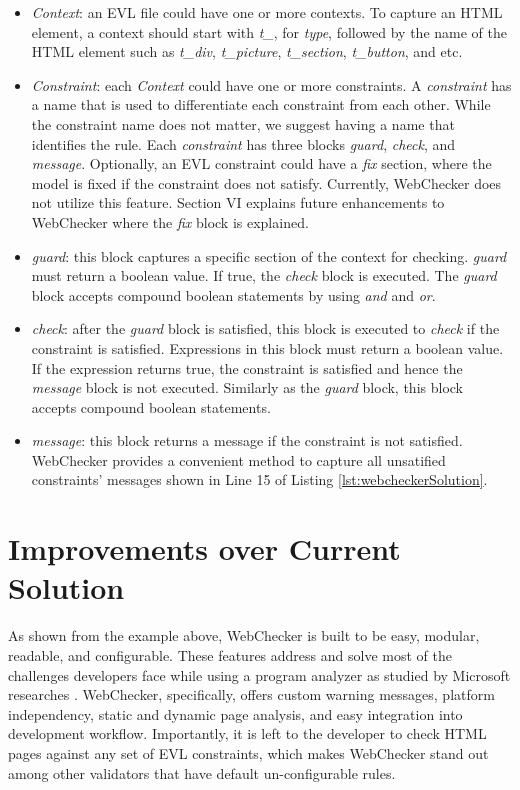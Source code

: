 \documentclass[conference]{IEEETran}
\begin{document}
\begin{itemize}
\item \textit{Context}: an EVL file could have one or more contexts. To capture an HTML element, a context should start with \textit{t\_}, for \textit{type}, followed by the name of the HTML element such as \textit{t\_div}, \textit{t\_picture}, \textit{t\_section}, \textit{t\_button}, and etc.
\item \textit{Constraint}: each \textit{Context} could have one or more constraints. A \textit{constraint} has a name that is used to differentiate each constraint from each other. While the constraint name does not matter, we suggest having a name that identifies the rule. Each \textit{constraint} has three blocks \textit{guard}, \textit{check}, and \textit{message}. Optionally, an EVL constraint could have a \textit{fix} section, where the model is fixed if the constraint does not satisfy. Currently, WebChecker does not utilize this feature. Section VI explains future enhancements to WebChecker where the \textit{fix} block is explained. 
\item \textit{guard}: this block captures a specific section of the context for checking. \textit{guard} must return a boolean value. If true, the \textit{check} block is executed. The \textit{guard} block accepts compound boolean statements by using \textit{and} and \textit{or}.      
\end{itemize}
\begin{itemize}
\item \textit{check}: after the \textit{guard} block is satisfied, this block is executed to \textit{check} if the constraint is satisfied. Expressions in this block must return a boolean value. If the expression returns true, the constraint is satisfied and hence the \textit{message} block is not executed. Similarly as the \textit{guard} block, this block accepts compound boolean statements.
\item \textit{message}: this block returns a message if the constraint is not satisfied. WebChecker provides a convenient method to capture all unsatified constraints' messages shown in Line 15 of Listing \ref{lst:webcheckerSolution}.  
\end{itemize}

\section{Improvements over Current Solution}
As shown from the example above, WebChecker is built to be easy, modular, readable, and configurable. These features address and solve most of the challenges developers face while using a program analyzer as studied by Microsoft researches \cite{christakis16}. WebChecker, specifically, offers custom warning messages, platform independency, static and dynamic page analysis, and easy integration into development workflow. Importantly, it is left to the developer to check HTML pages against any set of EVL constraints, which makes WebChecker stand out among other validators that have default un-configurable rules.    
\end{document}
